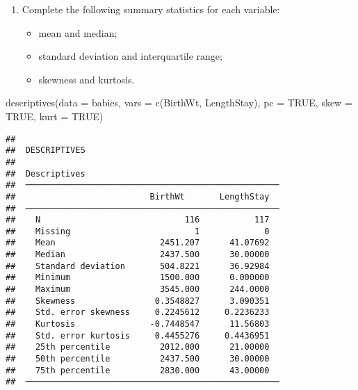 \documentclass[
]{memoir}
\newenvironment{Shaded}{\begin{snugshade}}{\end{snugshade}}
\newcommand{\AttributeTok}[1]{\textcolor[rgb]{0.77,0.63,0.00}{#1}}
\newcommand{\ConstantTok}[1]{\textcolor[rgb]{0.00,0.00,0.00}{#1}}
\newcommand{\FunctionTok}[1]{\textcolor[rgb]{0.00,0.00,0.00}{#1}}
\newcommand{\NormalTok}[1]{#1}
\providecommand{\tightlist}{%
  \setlength{\itemsep}{0pt}\setlength{\parskip}{0pt}}
\begin{document}
\begin{enumerate}
\def\labelenumi{\alph{enumi}.}
\setcounter{enumi}{1}
\tightlist
\item
  Complete the following summary statistics for each variable:

  \begin{itemize}
  \tightlist
  \item
    mean and median;
  \item
    standard deviation and interquartile range;
  \item
    skewness and kurtosis.
  \end{itemize}
\end{enumerate}

\begin{Shaded}
\begin{Highlighting}[]
\FunctionTok{descriptives}\NormalTok{(}\AttributeTok{data =}\NormalTok{ babies,}
             \AttributeTok{vars =} \FunctionTok{c}\NormalTok{(BirthWt, LengthStay),}
             \AttributeTok{pc =} \ConstantTok{TRUE}\NormalTok{,}
             \AttributeTok{skew =} \ConstantTok{TRUE}\NormalTok{,}
             \AttributeTok{kurt =} \ConstantTok{TRUE}\NormalTok{)}
\end{Highlighting}
\end{Shaded}

\begin{verbatim}
## 
##  DESCRIPTIVES
## 
##  Descriptives                                        
##  ─────────────────────────────────────────────────── 
##                           BirthWt       LengthStay   
##  ─────────────────────────────────────────────────── 
##    N                             116           117   
##    Missing                         1             0   
##    Mean                     2451.207      41.07692   
##    Median                   2437.500      30.00000   
##    Standard deviation       504.8221      36.92984   
##    Minimum                  1500.000      0.000000   
##    Maximum                  3545.000      244.0000   
##    Skewness                0.3548827      3.090351   
##    Std. error skewness     0.2245612     0.2236233   
##    Kurtosis               -0.7448547      11.56803   
##    Std. error kurtosis     0.4455276     0.4436951   
##    25th percentile          2012.000      21.00000   
##    50th percentile          2437.500      30.00000   
##    75th percentile          2830.000      43.00000   
##  ───────────────────────────────────────────────────
\end{verbatim}
\end{document}
